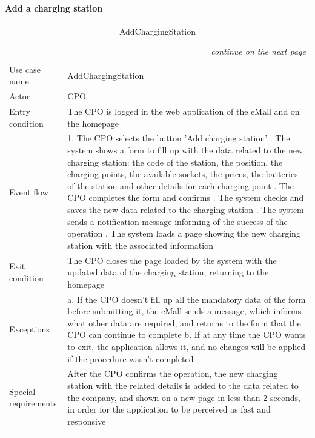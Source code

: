 \paragraph{Add a charging station}
\begin{center}
    \begin{longtable}{p{4cm} p{11cm}}
    \multicolumn{2}{r}{\itshape{continue on the next page}}\\
    \endfoot 
    \\
    \endlastfoot
    \hline
     Use case name &  AddChargingStation\\
     \hline
     Actor & CPO \\
     \hline
     Entry condition & The CPO is logged in the web application of the eMall and on the homepage \\
     \hline
     Event flow &   1. The CPO selects the button 'Add charging station' \newline
                    2. The system shows a form to fill up with the data related to the new charging station: the code of the station, the position, the charging points, the available sockets, the prices, the batteries of the station and other details for each charging point \newline
                    3. The CPO completes the form and confirms \newline
                    4. The system checks and saves the new data related to the charging station \newline
                    5. The system sends a notification message informing of the success of the operation \newline
                    6. The system loads a page showing the new charging station with the associated information\\
     \hline
     Exit condition &  The CPO closes the page loaded by the system with the updated data of the charging station, returning to the homepage \\
     \hline
     Exceptions &   a. If the CPO doesn't fill up all the mandatory data of the form before submitting it, the eMall                sends a message, which informs what other data are required, and returns to the form that the                   CPO can continue to complete \newline
                    b. If at any time the CPO wants to exit, the application allows it, and no changes will be applied if the procedure wasn't completed \\
     \hline
     Special requirements & After the CPO confirms the operation, the new charging station with the related details is added to the data related to the company, and shown on a new page in less than 2 seconds, in order for the application to be perceived as fast and responsive \\
     \hline
    \caption{AddChargingStation}
    \label{tab:AddChargingStation}
    \end{longtable}
\end{center}


